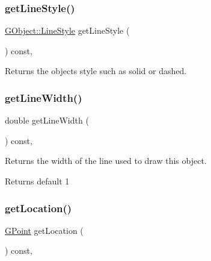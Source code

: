 \subsubsection{\texorpdfstring{get\+Line\+Style()}{getLineStyle()}}
{\footnotesize\ttfamily \mbox{\hyperlink{classGObject_a86e0f5648542856159bb40775c854aa7}{G\+Object\+::\+Line\+Style}} get\+Line\+Style (\begin{DoxyParamCaption}{ }\end{DoxyParamCaption}) const\hspace{0.3cm}{\ttfamily [virtual]}, {\ttfamily [inherited]}}



Returns the object\textquotesingle{}s style such as solid or dashed. 

\mbox{\label{classGObject_a85ff266dc3eb63d9f2d8e5a4487fd3c0}} 
\subsubsection{\texorpdfstring{get\+Line\+Width()}{getLineWidth()}}
{\footnotesize\ttfamily double get\+Line\+Width (\begin{DoxyParamCaption}{ }\end{DoxyParamCaption}) const\hspace{0.3cm}{\ttfamily [virtual]}, {\ttfamily [inherited]}}



Returns the width of the line used to draw this object. 

\begin{DoxyReturn}{Returns}
default 1 
\end{DoxyReturn}
\mbox{\label{classGObject_a4f83802015511edeb63b892830812c11}} 
\subsubsection{\texorpdfstring{get\+Location()}{getLocation()}}
{\footnotesize\ttfamily \mbox{\hyperlink{classGPoint}{G\+Point}} get\+Location (\begin{DoxyParamCaption}{ }\end{DoxyParamCaption}) const\hspace{0.3cm}{\ttfamily [virtual]}, {\ttfamily [inherited]}}




